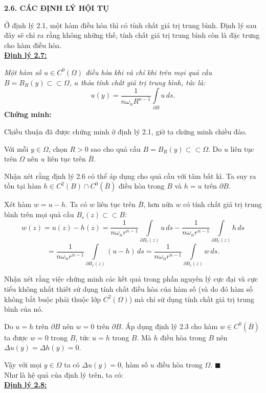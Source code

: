 \begin{center}
\textbf{2.6. CÁC ĐỊNH LÝ HỘI TỤ}
\end{center}

Ở định lý 2.1, một hàm điều hòa thì có tính chất giá trị trung bình. Định lý sau đây sẽ chỉ ra rằng không những thế, tính chất giá trị trung bình còn là đặc trưng cho hàm điều hòa.\\
\textbf{\underline{Định lý 2.7:}}

\textit{Một hàm số $u\in C^0(\Omega)$ điều hòa khi và chỉ khi trên mọi quả cầu $B=B_R(y)\subset\subset\Omega$, $u$ thỏa tính chất giá trị trung bình, tức là:
\[u(y)=\frac{1}{n\omega_n R^{n-1}}\int\limits_{\partial B}u\,ds.\]}
\textbf{Chứng minh:}

Chiều thuận đã được chứng minh ở định lý 2.1, giờ ta chứng minh chiều đảo.

Với mỗi $y\in\Omega$, chọn $R>0$ sao cho quả cầu $B=B_R(y)\subset\subset\Omega$. Do $u$ liên tục trên $\Omega$ nên $u$ liên tục trên $\overline{B}$.

Nhận xét rằng định lý 2.6 có thể áp dụng cho quả cầu với tâm bất kì. Ta suy ra tồn tại hàm $h\in C^2(B)\cap C^0(\overline{B})$ điều hòa trong $B$ và $h=u$ trên $\partial B$.

Xét hàm $w=u-h$. Ta có $w$ liên tục trên $\overline{B}$, hơn nữa $w$ có tính chất giá trị trung bình trên mọi quả cầu $B_r(z)\subset\subset B$:
\[w(z)=u(z)-h(z)=\frac{1}{n\omega_n r^{n-1}}\int\limits_{\partial B_r(z)}u\,ds-\frac{1}{n\omega_n r^{n-1}}\int\limits_{\partial B_r(z)}h\,ds\]
\[=\frac{1}{n\omega_n r^{n-1}}\int\limits_{\partial B_r(z)}(u-h)\,ds=\frac{1}{n\omega_n r^{n-1}}\int\limits_{\partial B_r(z)}w\,ds.\]

Nhận xét rằng việc chứng minh các kết quả trong phần nguyên lý cực đại và cực tiểu không nhất thiết sử dụng tính chất điều hòa của hàm số (và do đó hàm số không bắt buộc phải thuộc lớp $C^2(\Omega)$) mà chỉ sử dụng tính chất giá trị trung bình của nó.

Do $u=h$ trên $\partial B$ nên $w=0$ trên $\partial B$. Áp dụng định lý 2.3 cho hàm $w\in C^{0}(\overline{B})$ ta được $w=0$ trong $B$, tức $u = h$ trong $B$. Mà $h$ điều hòa trong $B$ nên $\Delta u(y)=\Delta h(y)=0$.

Vậy với mọi $y\in\Omega$ ta có $\Delta u(y)=0$, hàm số $u$ điều hòa trong $\Omega$. $\blacksquare$
\\

Như là hệ quả của định lý trên, ta có:\\
\textbf{\underline{Định lý 2.8:}}

